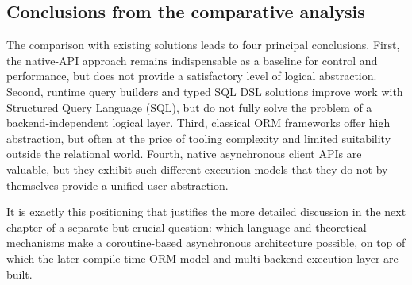 \subsection{Conclusions from the comparative analysis}

The comparison with existing solutions leads to four principal conclusions. First, the native-API approach remains indispensable as a baseline for control and performance, but does not provide a satisfactory level of logical abstraction. Second, runtime query builders and typed SQL DSL solutions improve work with Structured Query Language (SQL), but do not fully solve the problem of a backend-independent logical layer. Third, classical ORM frameworks offer high abstraction, but often at the price of tooling complexity and limited suitability outside the relational world. Fourth, native asynchronous client APIs are valuable, but they exhibit such different execution models that they do not by themselves provide a unified user abstraction.

It is exactly this positioning that justifies the more detailed discussion in the next chapter of a separate but crucial question: which language and theoretical mechanisms make a coroutine-based asynchronous architecture possible, on top of which the later compile-time ORM model and multi-backend execution layer are built.

